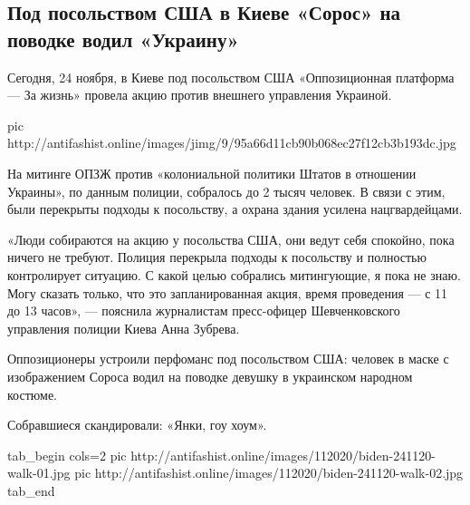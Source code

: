  
 
 
 
 
 
\subsection{Под посольством США в Киеве «Сорос» на поводке водил «Украину»}
\label{sec:24_11_2020.news.antifashist_online.1.soros_ukraine}

Сегодня, 24 ноября, в Киеве под посольством США «Оппозиционная платформа — За
жизнь» провела акцию против внешнего управления Украиной.

\ifcmt
pic http://antifashist.online/images/jimg/9/95a66d11cb90b068ec27f12cb3b193dc.jpg
\fi

На митинге ОПЗЖ против «колониальной политики Штатов в отношении Украины», по
данным полиции, собралось до 2 тысяч человек. В связи с этим, были перекрыты
подходы к посольству, а охрана здания усилена нацгвардейцами.

«Люди собираются на акцию у посольства США, они ведут себя спокойно, пока
ничего не требуют. Полиция перекрыла подходы к посольству и полностью
контролирует ситуацию. С какой целью собрались митингующие, я пока не знаю.
Могу сказать только, что это запланированная акция, время проведения — с 11 до
13 часов», — пояснила журналистам пресс-офицер Шевченковского управления
полиции Киева Анна Зубрева.

Оппозиционеры устроили перфоманс под посольством США: человек в маске с
изображением Сороса водил на поводке девушку в украинском народном костюме.

Собравшиеся скандировали: «Янки, гоу хоум».

\ifcmt
tab_begin cols=2
pic http://antifashist.online/images/112020/biden-241120-walk-01.jpg
pic http://antifashist.online/images/112020/biden-241120-walk-02.jpg
tab_end
\fi

